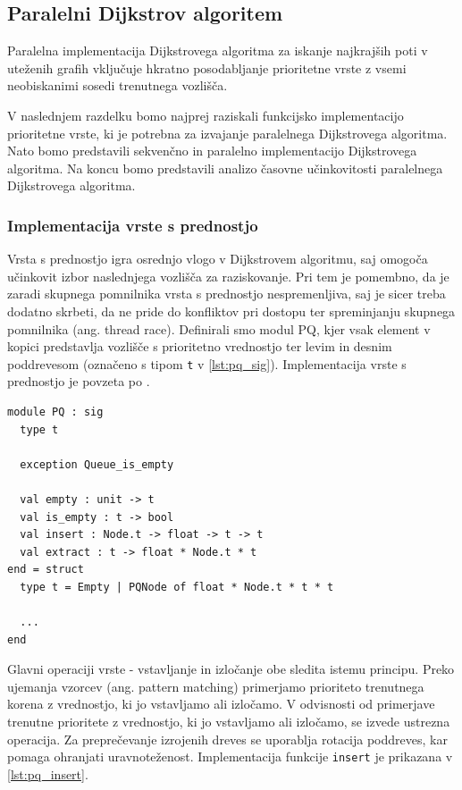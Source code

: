\documentclass[mat1, tisk]{fmfdelo}
\begin{document}
\subsection{Paralelni Dijkstrov algoritem} \label{section:dijkstra}

Paralelna implementacija Dijkstrovega algoritma za iskanje najkrajših poti v uteženih grafih vključuje hkratno posodabljanje
prioritetne vrste z vsemi neobiskanimi sosedi trenutnega vozlišča.

V naslednjem razdelku bomo najprej raziskali funkcijsko implementacijo prioritetne vrste, ki je potrebna za izvajanje
paralelnega Dijkstrovega algoritma. Nato bomo predstavili sekvenčno in paralelno implementacijo Dijkstrovega algoritma. 
Na koncu bomo predstavili analizo časovne učinkovitosti paralelnega Dijkstrovega algoritma.

\subsubsection{Implementacija vrste s prednostjo}

Vrsta s prednostjo igra osrednjo vlogo v Dijkstrovem algoritmu, saj omogoča učinkovit izbor naslednjega vozlišča za raziskovanje. 
Pri tem je pomembno, da je zaradi skupnega pomnilnika vrsta s prednostjo nespremenljiva, saj je sicer treba
dodatno skrbeti, da ne pride do konfliktov pri dostopu ter spreminjanju skupnega pomnilnika (ang. thread race). 
Definirali smo modul PQ, kjer vsak element v kopici predstavlja vozlišče s prioritetno vrednostjo ter levim in desnim poddrevesom
(označeno s tipom \texttt{t} v \ref{lst:pq_sig}). Implementacija vrste s prednostjo je povzeta po \cite{okasaki1996}.

\begin{lstlisting}[label=lst:pq_sig]
module PQ : sig
  type t

  exception Queue_is_empty

  val empty : unit -> t
  val is_empty : t -> bool
  val insert : Node.t -> float -> t -> t
  val extract : t -> float * Node.t * t
end = struct
  type t = Empty | PQNode of float * Node.t * t * t

  ...
end
\end{lstlisting}

Glavni operaciji vrste - vstavljanje in izločanje obe sledita istemu principu. Preko ujemanja vzorcev (ang. pattern matching)
primerjamo prioriteto trenutnega korena z vrednostjo, ki jo vstavljamo ali izločamo. V odvisnosti od primerjave trenutne
prioritete z vrednostjo, ki jo vstavljamo ali izločamo, se izvede ustrezna operacija. Za preprečevanje izrojenih dreves
se uporablja rotacija poddreves, kar pomaga ohranjati uravnoteženost. Implementacija funkcije \texttt{insert} je prikazana
v \ref{lst:pq_insert}.
\end{document}
